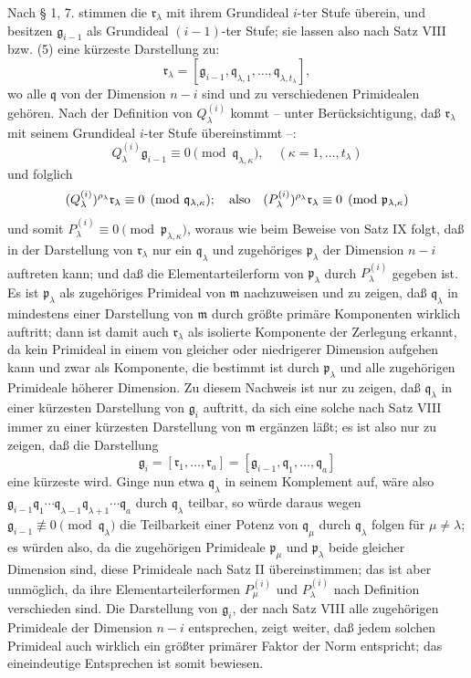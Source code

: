 \documentclass[11pt]{article}
\providecommand{\frakm}{\mathfrak m}
\providecommand{\frakp}{\mathfrak p}
\providecommand{\frakq}{\mathfrak q}
\providecommand{\frakr}{\mathfrak r}
\providecommand{\frakg}{\mathfrak g}
\begin{document}
Nach § 1, 7. stimmen die $\frakr_\lambda$ mit ihrem Grundideal $i$-ter Stufe überein, und besitzen $\frakg_{i-1}$ als Grundideal $(i-1)$-ter Stufe; sie lassen also nach Satz VIII bzw. (5) eine kürzeste Darstellung zu:
\[
 \frakr_\lambda=[\frakg_{i-1},\frakq_{\lambda,1},\ldots,\frakq_{\lambda,t_\lambda}],
\]
wo alle $\frakq$ von der Dimension $n-i$ sind und zu verschiedenen Primidealen gehören. Nach der Definition von $Q_\lambda^{(i)}$ kommt -- unter Berücksichtigung, daß $\frakr_\lambda$ mit seinem Grundideal $i$-ter Stufe übereinstimmt --:
\[
 Q_\lambda^{(i)}\frakg_{i-1}\equiv0\pmod{\frakq_{\lambda,\kappa}},
 \quad(\kappa=1,\ldots,t_\lambda)
\]
und folglich
\[
 (Q_\lambda^{(i)})^{\rho_\lambda}\frakr_\lambda\equiv0\pmod{\frakq_{\lambda,\kappa}};
 \quad\hbox{also}\quad
 (P_\lambda^{(i)})^{\rho_\lambda}\frakr_\lambda\equiv0\pmod{\frakp_{\lambda,\kappa}}
\]
und somit $P_\lambda^{(i)}\equiv0\pmod{\frakp_{\lambda,\kappa}}$, woraus wie beim Beweise von Satz IX folgt, daß in der Darstellung von $\frakr_\lambda$ nur ein $\frakq_\lambda$ und zugehöriges $\frakp_\lambda$ der Dimension $n-i$ auftreten kann; und daß die Elementarteilerform von $\frakp_\lambda$ durch $P_\lambda^{(i)}$ gegeben ist. Es ist $\frakp_\lambda$ als zugehöriges Primideal von $\frakm$ nachzuweisen und zu zeigen, daß $\frakq_\lambda$ in mindestens einer Darstellung von $\frakm$ durch größte primäre Komponenten wirklich auftritt; dann ist damit auch $\frakr_\lambda$ als isolierte Komponente der Zerlegung erkannt, da kein Primideal in einem von gleicher oder niedrigerer Dimension aufgehen kann und zwar als Komponente, die bestimmt ist durch $\frakp_\lambda$ und alle zugehörigen Primideale höherer Dimension. Zu diesem Nachweis ist nur zu zeigen, daß $\frakq_\lambda$ in einer kürzesten Darstellung von $\frakg_i$ auftritt, da sich eine solche nach Satz VIII immer zu einer kürzesten Darstellung von $\frakm$ ergänzen läßt; es ist also nur zu zeigen, daß die Darstellung
\[
 \frakg_i=[\frakr_1,\ldots,\frakr_a]=[\frakg_{i-1},\frakq_1,\ldots,\frakq_a]
\]
eine kürzeste wird. Ginge nun etwa $\frakq_\lambda$ in seinem Komplement auf, wäre also $\frakg_{i-1}\frakq_1\cdots\frakq_{\lambda-1}\frakq_{\lambda+1}\cdots\frakq_a$ durch $\frakq_\lambda$ teilbar, so würde daraus wegen $\frakg_{i-1}\not\equiv0\pmod{\frakq_\lambda}$ die Teilbarkeit einer Potenz von $\frakq_\mu$ durch $\frakq_\lambda$ folgen für $\mu\ne\lambda$; es würden also, da die zugehörigen Primideale $\frakp_\mu$ und $\frakp_\lambda$ beide gleicher Dimension sind, diese Primideale nach Satz II übereinstimmen; das ist aber unmöglich, da ihre Elementarteilerformen $P_\mu^{(i)}$ und $P_\lambda^{(i)}$ nach Definition verschieden sind. Die Darstellung von $\frakg_i$, der nach Satz VIII alle zugehörigen Primideale der Dimension $n-i$ entsprechen, zeigt weiter, daß jedem solchen Primideal auch wirklich ein größter primärer Faktor der Norm entspricht; das eineindeutige Entsprechen ist somit bewiesen.
\end{document}
